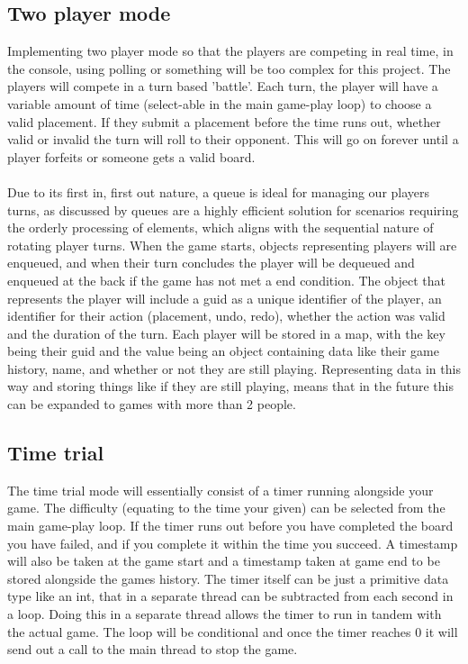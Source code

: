 \documentclass{article}
\begin{document}
\subsection{Two player mode}
Implementing two player mode so that the players are competing in real time, in the console, using polling or something will be too complex for this project. The players will compete in a turn based 'battle'. Each turn, the player will have a variable amount of time (select-able in the main game-play loop) to choose a valid placement. If they submit a placement before the time runs out, whether valid or invalid the turn will roll to their opponent. This will go on forever until a player forfeits or someone gets a valid board. \\\\
Due to its first in, first out nature, a queue is ideal for managing our players turns, as discussed by \parencite{goodrich2013} queues are a highly efficient solution for scenarios requiring the orderly processing of elements, which aligns with the sequential nature of rotating player turns. When the game starts, objects representing players will are enqueued, and when their turn concludes the player will be dequeued and enqueued at the back if the game has not met a end condition. The object that represents the player will include a guid as a unique identifier of the player, an identifier for their action (placement, undo, redo), whether the action was valid and the duration of the turn. Each player will be stored in a map, with the key being their guid and the value being an object containing data like their game history, name, and whether or not they are still playing. Representing data in this way and storing things like if they are still playing, means that in the future this can be expanded to games with more than 2 people.

\subsection{Time trial}
The time trial mode will essentially consist of a timer running alongside your game. The difficulty (equating to the time your given) can be selected from the main game-play loop. If the timer runs out before you have completed the board you have failed, and if you complete it within the time you succeed. A timestamp will also be taken at the game start and a timestamp taken at game end to be stored alongside the games history. The timer itself can be just a primitive data type like an int, that in a separate thread can be subtracted from each second in a loop. Doing this in a separate thread allows the timer to run in tandem with the actual game. The loop will be conditional and once the timer reaches 0 it will send out a call to the main thread to stop the game.

\medskip

\printbibliography
\end{document}
